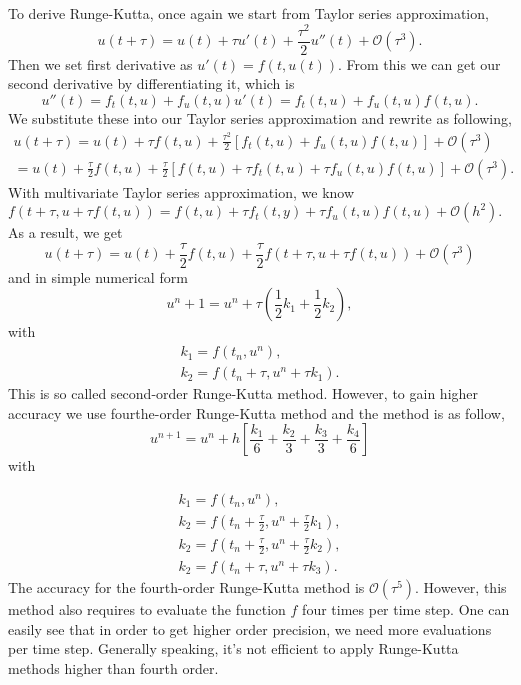 \documentclass[10pt,a4paper]{report}
\begin{document}
To derive Runge-Kutta, once again we start from Taylor series approximation, 
\begin{equation}
u(t+\tau)=u(t)+\tau u'(t)+{\frac{\tau^2}{2}}u''(t)+\mathcal{O}(\tau^3).
\end{equation}
\[\]
Then we set first derivative as $u'(t)=f(t,u(t))$. From this we can get our second derivative by differentiating it, which is
\begin{equation}
u''(t)=f_t(t,u)+f_u(t,u)u'(t)=f_t(t,u)+f_u(t,u)f(t,u).
\end{equation}
 \[\] We substitute these into our Taylor series approximation and rewrite as following,
\begin{align} %
u(t+\tau)
=u(t)+\tau f(t,u)+{\frac{\tau^2}{2}}[f_t(t,u)+f_u(t,u)f(t,u)]+\mathcal{O}(\tau^3)\\
=u(t)+{\frac{\tau}{2}} f(t,u)+{\frac{\tau}{2}}[f(t,u)+\tau f_t(t,u)+\tau f_u(t,u)f(t,u)]+\mathcal{O}(\tau^3).  
\end{align}
With multivariate Taylor series approximation, we know $f(t+\tau,u+\tau f(t,u))=f(t,u)+\tau f_t(t,y)+\tau f_u(t,u)f(t,u)+\mathcal{O}(h^2).$ As a result, we get
\begin{equation}
u(t+\tau)=u(t)+{\frac{\tau}{2}}f(t,u)+{\frac{\tau}{2}}f(t+\tau,u+\tau f(t,u))+\mathcal{O}(\tau^3)
\end{equation}
 \[\] and in simple numerical form
\begin{equation}
 u^n+1=u^n+\tau ({\frac{1}{2}}k_1+{\frac{1}{2}}k_2),
 \end{equation} 
\[\]with 
\begin{align}
k_1=f(t_n,u^n),\\
k_2 = f(t_n+\tau, u^n+\tau k_1).
\end{align}
This is so called second-order Runge-Kutta method. However, to gain higher accuracy we use fourthe-order Runge-Kutta method and the method is as follow,
\begin{equation}
u^{n+1}=u^n+h[{\frac{k_1}{6}}+{\frac{k_2}{3}}+{\frac{k_3}{3}}+{\frac{k_4}{6}}]
\end{equation}
\[\]
with

\begin{align*}
k_1=f(t_n,u^n),\\
k_2=f(t_n+{\frac{\tau}{2}},u^n+{\frac{\tau}{2}}k_1),\\
k_2=f(t_n+{\frac{\tau}{2}},u^n+{\frac{\tau}{2}}k_2),\\
k_2=f(t_n+\tau,u^n+\tau k_3).
\end{align*}
The accuracy for the fourth-order Runge-Kutta method is $\mathcal{O}(\tau^5)$. However, this method also requires to evaluate the function $f$ four times per time step. One can easily see that in order to get higher order precision, we need more evaluations per time step. Generally speaking, it's not efficient to apply Runge-Kutta methods higher than fourth order. 
\end{document}

